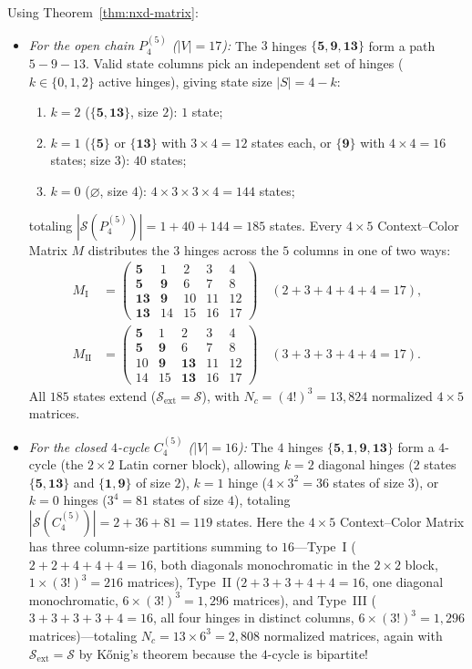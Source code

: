 \documentclass[aps,pra,reprint,superscriptaddress,longbibliography,nofootinbib,floatfix,10pt]{revtex4-2}
\theoremstyle{definition}\newtheorem{definition}[theorem]{Definition}
\theoremstyle{remark}\newtheorem{remark}[theorem]{Remark}
\newcommand{\Sc}{\mathcal S}\newcommand{\Cc}{\mathcal C}
\begin{document}
Using Theorem~\ref{thm:nxd-matrix}:
\begin{itemize}
\item \emph{For the open chain $P_4^{(5)}$ ($|V|=17$):} The $3$ hinges $\{\mathbf{5},\mathbf{9},\mathbf{13}\}$ form a path $5-9-13$. Valid state columns pick an independent set of hinges ($k\in\{0,1,2\}$ active hinges), giving state size $|S|=4-k$:
\begin{enumerate}
\item $k=2$ ($\{\mathbf{5},\mathbf{13}\}$, size $2$): $1$ state;
\item $k=1$ ($\{\mathbf{5}\}$ or $\{\mathbf{13}\}$ with $3\times 4=12$ states each, or $\{\mathbf{9}\}$ with $4\times 4=16$ states; size $3$): $40$ states;
\item $k=0$ ($\varnothing$, size $4$): $4\times 3\times 3\times 4=144$ states;
\end{enumerate}
totaling $|\Sc(P_4^{(5)})|=1+40+144=185$ states. Every $4\times 5$ Context--Color Matrix $M$ distributes the $3$ hinges across the $5$ columns in one of two ways:
\begin{equation}\label{eq:P4-5-matrices}
\begin{aligned}
M_{\mathrm{I}}&=\begin{pmatrix}
\mathbf{5} & 1 & 2 & 3 & 4\\
\mathbf{5} & \mathbf{9} & 6 & 7 & 8\\
\mathbf{13} & \mathbf{9} & 10 & 11 & 12\\
\mathbf{13} & 14 & 15 & 16 & 17
\end{pmatrix}\quad (2+3+4+4+4=17),\\[4pt]
M_{\mathrm{II}}&=\begin{pmatrix}
\mathbf{5} & 1 & 2 & 3 & 4\\
\mathbf{5} & \mathbf{9} & 6 & 7 & 8\\
10 & \mathbf{9} & \mathbf{13} & 11 & 12\\
14 & 15 & \mathbf{13} & 16 & 17
\end{pmatrix}\quad (3+3+3+4+4=17).
\end{aligned}
\end{equation}
All $185$ states extend ($\Sc_{\mathrm{ext}}=\Sc$), with $N_c=(4!)^3=13{,}824$ normalized $4\times 5$ matrices.
\item \emph{For the closed $4$-cycle $C_4^{(5)}$ ($|V|=16$):} The $4$ hinges $\{\mathbf{5},\mathbf{1},\mathbf{9},\mathbf{13}\}$ form a $4$-cycle (the $2\times 2$ Latin corner block), allowing $k=2$ diagonal hinges ($2$ states $\{\mathbf{5},\mathbf{13}\}$ and $\{\mathbf{1},\mathbf{9}\}$ of size $2$), $k=1$ hinge ($4\times 3^2=36$ states of size $3$), or $k=0$ hinges ($3^4=81$ states of size $4$), totaling $|\Sc(C_4^{(5)})|=2+36+81=119$ states. Here the $4\times 5$ Context--Color Matrix has three column-size partitions summing to $16$—Type~I ($2+2+4+4+4=16$, both diagonals monochromatic in the $2\times 2$ block, $1\times(3!)^3=216$ matrices), Type~II ($2+3+3+4+4=16$, one diagonal monochromatic, $6\times(3!)^3=1{,}296$ matrices), and Type~III ($3+3+3+3+4=16$, all four hinges in distinct columns, $6\times(3!)^3=1{,}296$ matrices)—totaling $N_c=13\times 6^3=2{,}808$ normalized matrices, again with $\Sc_{\mathrm{ext}}=\Sc$ by K\H{o}nig's theorem because the $4$-cycle is bipartite!

\end{itemize}
\end{document}
